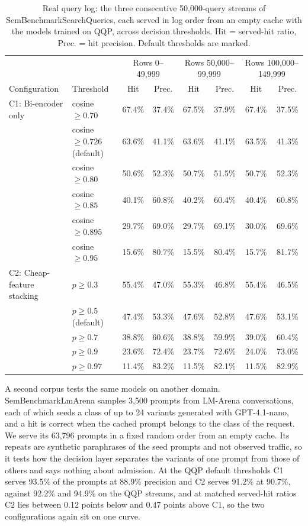 \documentclass[authoryear,preprint,review,12pt]{elsarticle}
\begin{document}
\begin{table}[htbp]
\centering
\caption{Real query log: the three consecutive 50,000-query streams of SemBenchmarkSearchQueries, each served in log order from an empty cache with the models trained on QQP, across decision thresholds. Hit = served-hit ratio, Prec. = hit precision. Default thresholds are marked.}
\label{tab:searchqueries}
\scriptsize
\setlength{\tabcolsep}{3pt}
\begin{tabular}{llcccccc}
\toprule
 & & \multicolumn{2}{c}{Rows 0--49,999} & \multicolumn{2}{c}{Rows 50,000--99,999} & \multicolumn{2}{c}{Rows 100,000--149,999} \\
Configuration & Threshold & Hit & Prec. & Hit & Prec. & Hit & Prec. \\
\midrule
C1: Bi-encoder only & cosine $\geq 0.70$ & 67.4\% & 37.4\% & 67.5\% & 37.9\% & 67.4\% & 37.5\% \\
 & cosine $\geq 0.726$ (default) & 63.6\% & 41.1\% & 63.6\% & 41.1\% & 63.5\% & 41.3\% \\
 & cosine $\geq 0.80$ & 50.6\% & 52.3\% & 50.7\% & 51.5\% & 50.7\% & 52.3\% \\
 & cosine $\geq 0.85$ & 40.1\% & 60.8\% & 40.2\% & 60.4\% & 40.4\% & 60.8\% \\
 & cosine $\geq 0.895$ & 29.7\% & 69.0\% & 29.7\% & 69.1\% & 30.0\% & 69.6\% \\
 & cosine $\geq 0.95$ & 15.6\% & 80.7\% & 15.5\% & 80.4\% & 15.7\% & 81.7\% \\
\midrule
C2: Cheap-feature stacking & $p \geq 0.3$ & 55.4\% & 47.0\% & 55.3\% & 46.8\% & 55.4\% & 46.5\% \\
 & $p \geq 0.5$ (default) & 47.4\% & 53.3\% & 47.6\% & 52.8\% & 47.6\% & 53.1\% \\
 & $p \geq 0.7$ & 38.8\% & 60.6\% & 38.8\% & 59.9\% & 39.0\% & 60.4\% \\
 & $p \geq 0.9$ & 23.6\% & 72.4\% & 23.7\% & 72.6\% & 24.0\% & 73.0\% \\
 & $p \geq 0.97$ & 11.4\% & 83.2\% & 11.5\% & 82.1\% & 11.5\% & 82.9\% \\
\bottomrule
\end{tabular}
\end{table}

A second corpus tests the same models on another domain. SemBenchmarkLmArena \citep{schroeder2026vcache} samples 3,500 prompts from LM-Arena conversations, each of which seeds a class of up to 24 variants generated with GPT-4.1-nano, and a hit is correct when the cached prompt belongs to the class of the request. We serve its 63,796 prompts in a fixed random order from an empty cache. Its repeats are synthetic paraphrases of the seed prompts and not observed traffic, so it tests how the decision layer separates the variants of one prompt from those of others and says nothing about admission. At the QQP default thresholds C1 serves 93.5\% of the prompts at 88.9\% precision and C2 serves 91.2\% at 90.7\%, against 92.2\% and 94.9\% on the QQP streams, and at matched served-hit ratios C2 lies between 0.12 points below and 0.47 points above C1, so the two configurations again sit on one curve.
\end{document}
